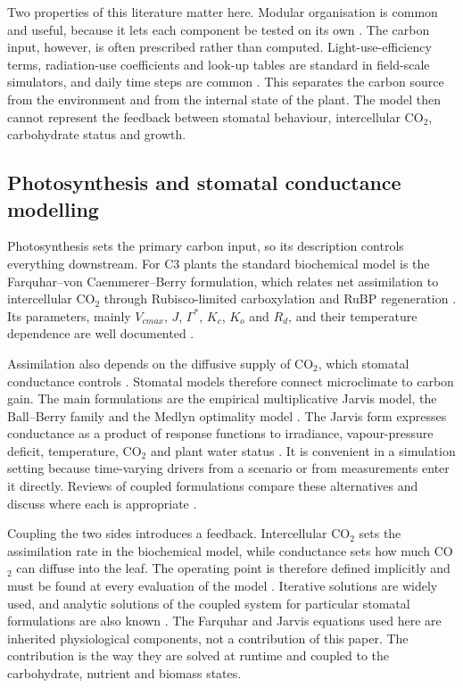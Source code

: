 Two properties of this literature matter here. Modular organisation is common
and useful, because it lets each component be tested on its own
\cite{Sievnen2014,Zeigler2000}. The carbon input, however, is often prescribed
rather than computed. Light-use-efficiency terms, radiation-use coefficients
and look-up tables are standard in field-scale simulators, and daily time steps
are common \cite{Jones2003,deWit2019,Holzworth2014}. This separates the carbon
source from the environment and from the internal state of the plant. The model
then cannot represent the feedback between stomatal behaviour, intercellular
CO$_2$, carbohydrate status and growth.

\subsection{Photosynthesis and stomatal conductance modelling}

Photosynthesis sets the primary carbon input, so its description controls
everything downstream. For C3 plants the standard biochemical model is the
Farquhar--von Caemmerer--Berry formulation, which relates net assimilation to
intercellular CO$_2$ through Rubisco-limited carboxylation and RuBP
regeneration \cite{Farquhar1980,vonCaemmerer2000}. Its parameters, mainly
$V_{cmax}$, $J$, $\Gamma^*$, $K_c$, $K_o$ and $R_d$, and their temperature
dependence are well documented \cite{Sharkey2007,Bernacchi2001,Dubois2007}.

Assimilation also depends on the diffusive supply of CO$_2$, which stomatal
conductance controls \cite{Lawson2014}. Stomatal models therefore connect
microclimate to carbon gain. The main formulations are the empirical
multiplicative Jarvis model, the Ball--Berry family and the Medlyn optimality
model \cite{Jarvis1976,Ball1987,Medlyn2011}. The Jarvis form expresses
conductance as a product of response functions to irradiance, vapour-pressure
deficit, temperature, CO$_2$ and plant water status \cite{Jarvis1976,YU2017,Yu2021}.
It is convenient in a simulation setting because time-varying drivers from a
scenario or from measurements enter it directly. Reviews of coupled
formulations compare these alternatives and discuss where each is appropriate
\cite{Damour2010,Buckley2017}.

Coupling the two sides introduces a feedback. Intercellular CO$_2$ sets the
assimilation rate in the biochemical model, while conductance sets how much
CO$_2$ can diffuse into the leaf. The operating point is therefore defined
implicitly and must be found at every evaluation of the model
\cite{Damour2010}. Iterative solutions are widely used, and analytic solutions
of the coupled system for particular stomatal formulations are also known
\cite{Buckley2017,Kim2003}. The Farquhar and Jarvis equations used here are
inherited physiological components, not a contribution of this paper. The
contribution is the way they are solved at runtime and coupled to the
carbohydrate, nutrient and biomass states.

